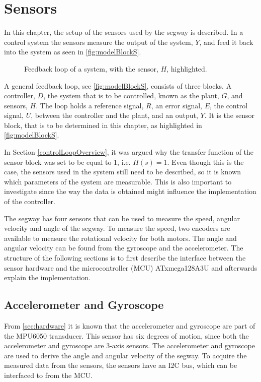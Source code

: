 \chapter{Sensors}
In this chapter, the setup of the sensors used by the segway is described. In a control system the sensors measure the output of the system, $Y$, and feed it back into the system as seen in \autoref{fig:modelBlockS}.

\begin{figure}[H]
\centering
\scalebox{0.8}{

}
\caption{Feedback loop of a system, with the sensor, $H$, highlighted.}
\label{fig:modelBlockS}
\end{figure}
A general feedback loop, see \autoref{fig:modelBlockS}, consists of three blocks. A controller, $D$, the system that is to be controlled, known as the plant, $G$, and sensors, $H$. The loop holds a reference signal, $R$, an error signal, $E$, the control signal, $U$, between the controller and the plant, and an output, $Y$. It is the sensor block, that is to be determined in this chapter, as highlighted in \autoref{fig:modelBlockS}.

In Section \ref{controlLoopOverview}, it was argued why the transfer function of the sensor block was set to be equal to 1, i.e. $H(s)=1$. Even though this is the case, the sensors used in the system still need to be described, so it is known which parameters of the system are measurable. This is also important to investigate since the way the data is obtained might influence the implementation of the controller.

The segway has four sensors that can be used to measure the speed, angular velocity and angle of the segway. To measure the speed, two encoders are available to measure the rotational velocity for both motors. The angle and angular velocity can be found from the gyroscope and the accelerometer. The structure of the following sections is to first describe the interface between the sensor hardware and the microcontroller (MCU) ATxmega128A3U and afterwards explain the implementation. %

\section{Accelerometer and Gyroscope}
From \autoref{sec:hardware} it is known that the accelerometer and gyroscope are part of the MPU6050 transducer. This sensor has six degrees of motion, since both the accelerometer and gyroscope are 3-axis sensors. The accelerometer and gyroscope are used to derive the angle and angular velocity of the segway. To acquire the measured data from the sensors, the sensors have an \gls{I2C} bus, which can be interfaced to from the MCU.
  
